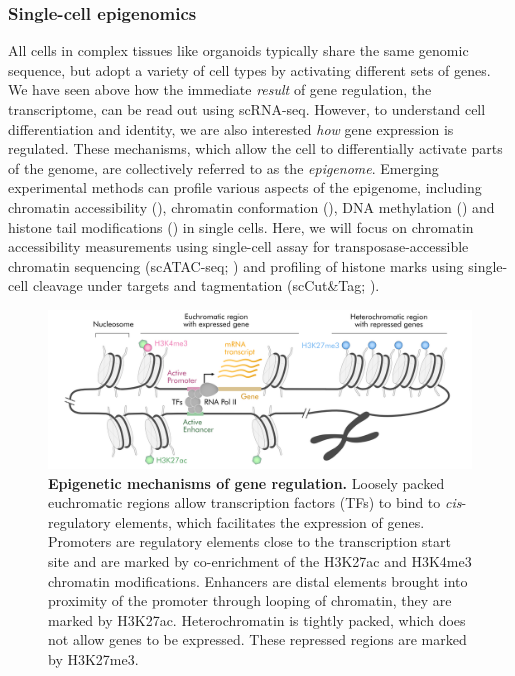 \subsubsection{Single-cell epigenomics}

All cells in complex tissues like organoids typically share the same genomic sequence, but adopt a variety of cell types by activating different sets of genes. We have seen above how the immediate \textit{result} of gene regulation, the transcriptome, can be read out using scRNA-seq. However, to understand cell differentiation and identity, we are also interested \textit{how} gene expression is regulated. These mechanisms, which allow the cell to differentially activate parts of the genome, are collectively referred to as the \textit{epigenome}. Emerging experimental methods can profile various aspects of the epigenome, including chromatin accessibility (\cite{buenrostro_single-cell_2015,cusanovich_multiplex_2015}), chromatin conformation (\cite{ramani_massively_2017,stevens_3d_2017}), DNA methylation (\cite{smallwood_single-cell_2014}) and histone tail modifications (\cite{kaya-okur_cuttag_2019,bartosovic_single-cell_2021,ku_single-cell_2019,hainer_profiling_2019}) in single cells. Here, we will focus on chromatin accessibility measurements using single-cell assay for transposase-accessible chromatin sequencing (scATAC-seq; \cite{buenrostro_single-cell_2015}) and profiling of histone marks using single-cell cleavage under targets and tagmentation (scCut\&Tag; \cite{kaya-okur_cuttag_2019}).

\begin{figure}[b!]
  \centering
\includegraphics[width=\textwidth]{figures/introduction/Figure_chromatin}
  \caption{\textbf{Epigenetic mechanisms of gene regulation.} Loosely packed euchromatic regions allow transcription factors (TFs) to bind to \textit{cis}-regulatory elements, which facilitates the expression of genes. Promoters are regulatory elements close to the transcription start site and are marked by co-enrichment of the H3K27ac and H3K4me3 chromatin modifications. Enhancers are distal elements brought into proximity of the promoter through looping of chromatin, they are marked by H3K27ac. Heterochromatin is tightly packed, which does not allow genes to be expressed. These repressed regions are marked by H3K27me3.}
  \label{fig:intro3}
\end{figure}

